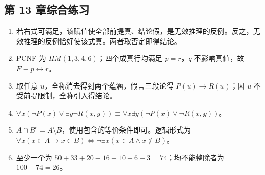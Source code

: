 \documentclass[UTF8,fontset=none,zihao=-4,a4paper]{ctexart}
\begin{document}
\subsection*{第 13 章\quad 综合练习}
\begin{enumerate}[label=13.\arabic*.,leftmargin=2.8em]
\item 若右式可满足，该赋值使全部前提真、结论假，是无效推理的反例。反之，无效推理的反例恰好使该式真。两者取否定即得结论。

\item PCNF 为 $\Pi M(1,3,4,6)$；四个成真行均满足 $p=r$，$q$ 不影响真值，故 $F\equiv p\leftrightarrow r$。

\item 取任意 $u$，全称消去得到两个蕴涵，假言三段论得 $P(u)\to R(u)$；因 $u$ 不受前提限制，全称引入得结论。

\item $\forall x(\neg P(x)\lor\exists y\neg R(x,y))\equiv\forall x\exists y(\neg P(x)\lor\neg R(x,y))$。

\item $A\cap B^c=A\setminus B$，使用包含的等价条件即可。逻辑形式为 $\forall x(x\in A\to x\in B)\Longleftrightarrow\neg\exists x(x\in A\land x\notin B)$。

\item 至少一个为 $50+33+20-16-10-6+3=74$；均不能整除者为 $100-74=26$。
\end{enumerate}
\end{document}
